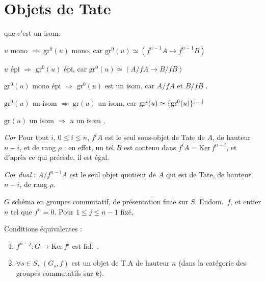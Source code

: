 \documentclass[11pt,a4paper]{article}
\begin{document}
\section{Objets de Tate}

\ill{} que c'est un isom.

$u$ mono $\Rightarrow$ $\mathrm{gr}^0(u)$ mono, car
$\mathrm{gr}^0(u) \simeq (f^{n-1}A \to f^{n-1}B)$

$u$ épi $\Rightarrow$ $\mathrm{gr}^0(u)$ épi, car
$\mathrm{gr}^0(u) \simeq (A/fA \to B/fB)$

$\mathrm{gr}^0(u)$ mono  épi $\Rightarrow$ $\mathrm{gr}^0(u)$ est
un isom, car $A/fA$ et $B/fB$ .

$\mathrm{gr}^0(u)$ un isom $\Rightarrow$ $\mathrm{gr}(u)$ un isom, car
$\mathrm{gr}^i(u) \simeq \lbrace \mathrm{gr}^0(u) \rbrace^{\ill{}}$ \ill{}

$\mathrm{gr}(u)$ un isom $\Rightarrow$ $u$ un isom .

\emph{Cor} Pour tout $i$, $0 \leq i \leq n$, $f^iA$ est le seul
sous-objet de Tate de
$A$, de hauteur $n-i$, et de rang $\rho$ : en effet, un tel $B$ est contenu
dans $f^iA = \mathrm{Ker}\, f^{n-i}$, et d'après ce qui précède, il
 est égal.

\emph{Cor dual} : $A/f^{n-i}A$ est \struck{\ill{}} le seul objet quotient
de $A$ qui est de Tate, de hauteur $n-i$, de rang $\rho$.



$G$ schéma en groupes commutatif,   de
présentation finie sur $S$. Endom.\ $f$, et entier $n$ tel que $f^n = 0$.
Pour $1 \leq j \leq n-1$ fixé,

Conditions équivalentes :
\begin{enumerate}
  \item[(i)] [$\mathrm{Ker}\, f^j$ est plat, et] \struck{\ill{}}
  $f^{n-j} : G \to \mathrm{Ker}\, f^j$ est fid.\ .
  \item[(ii)] $\forall s \in S$, $(G_s, f)$ est un objet de T.A de hauteur
  $n$ (dans la catégorie des \struck{\ill{}} groupes 
  commutatifs sur $k$).
\end{enumerate}
\end{document}
